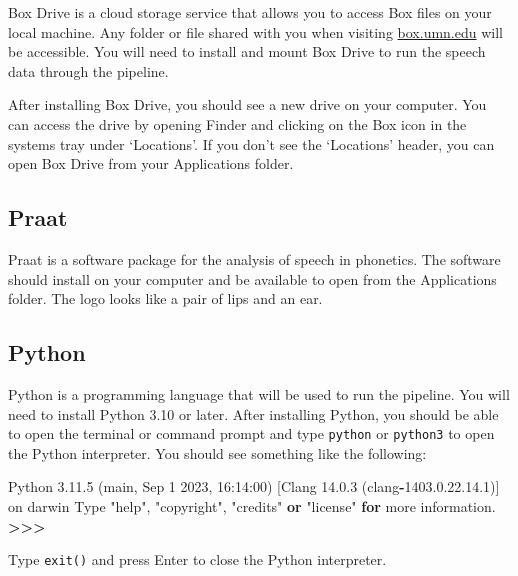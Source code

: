 \documentclass[
]{book}
\newenvironment{Shaded}{\begin{snugshade}}{\end{snugshade}}
\newcommand{\ControlFlowTok}[1]{\textcolor[rgb]{0.13,0.29,0.53}{\textbf{#1}}}
\newcommand{\DecValTok}[1]{\textcolor[rgb]{0.00,0.00,0.81}{#1}}
\newcommand{\FloatTok}[1]{\textcolor[rgb]{0.00,0.00,0.81}{#1}}
\newcommand{\KeywordTok}[1]{\textcolor[rgb]{0.13,0.29,0.53}{\textbf{#1}}}
\newcommand{\NormalTok}[1]{#1}
\newcommand{\OperatorTok}[1]{\textcolor[rgb]{0.81,0.36,0.00}{\textbf{#1}}}
\newcommand{\StringTok}[1]{\textcolor[rgb]{0.31,0.60,0.02}{#1}}
\begin{document}
Box Drive is a cloud storage service that allows you to access Box files on your local machine. Any folder or file shared with you when visiting \href{https://box.umn.edu/}{box.umn.edu} will be accessible. You will need to install and mount Box Drive to run the speech data through the pipeline.

After installing Box Drive, you should see a new drive on your computer. You can access the drive by opening Finder and clicking on the Box icon in the systems tray under `Locations'. If you don't see the `Locations' header, you can open Box Drive from your Applications folder.

\subsection{Praat}\label{praat}

Praat is a software package for the analysis of speech in phonetics. The software should install on your computer and be available to open from the Applications folder. The logo looks like a pair of lips and an ear.

\subsection{Python}\label{python}

Python is a programming language that will be used to run the pipeline. You will need to install Python 3.10 or later. After installing Python, you should be able to open the terminal or command prompt and type \texttt{python} or \texttt{python3} to open the Python interpreter. You should see something like the following:

\begin{Shaded}
\begin{Highlighting}[]
\NormalTok{Python }\FloatTok{3.11.5}\NormalTok{ (main, Sep  }\DecValTok{1} \DecValTok{2023}\NormalTok{, }\DecValTok{16}\NormalTok{:}\DecValTok{14}\NormalTok{:}\DecValTok{00}\NormalTok{) [Clang }\FloatTok{14.0.3}\NormalTok{ (clang}\OperatorTok{{-}}\FloatTok{1403.0.22.14.1}\NormalTok{)] on darwin}
\NormalTok{Type }\StringTok{"help"}\NormalTok{, }\StringTok{"copyright"}\NormalTok{, }\StringTok{"credits"} \KeywordTok{or} \StringTok{"license"} \ControlFlowTok{for}\NormalTok{ more information.}
\OperatorTok{\textgreater{}\textgreater{}\textgreater{}}
\end{Highlighting}
\end{Shaded}

Type \texttt{exit()} and press Enter to close the Python interpreter.
\end{document}
